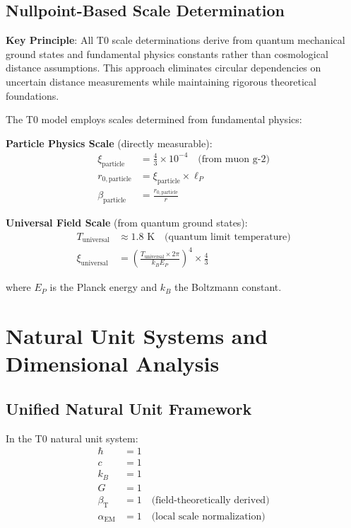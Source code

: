 \documentclass[12pt,a4paper]{article}
\newcommand{\betaT}{\beta_{\text{T}}}
\newcommand{\alphaEM}{\alpha_{\text{EM}}}
\begin{document}
	\subsection{Nullpoint-Based Scale Determination}
	\label{subsec:nullpoint_methodology}
	
	\begin{tcolorbox}[colback=orange!5!white,colframe=orange!75!black,title=Nullpoint-Based Universal Methodology]
		\textbf{Key Principle}: All T0 scale determinations derive from quantum mechanical ground states and fundamental physics constants rather than cosmological distance assumptions. This approach eliminates circular dependencies on uncertain distance measurements while maintaining rigorous theoretical foundations.
	\end{tcolorbox}
	
	The T0 model employs scales determined from fundamental physics:
	
	\textbf{Particle Physics Scale} (directly measurable):
	\begin{align}
		\xi_{\text{particle}} &= \frac{4}{3} \times 10^{-4} \quad \text{(from muon g-2)} \\
		r_{0,\text{particle}} &= \xi_{\text{particle}} \times \ell_P \\
		\beta_{\text{particle}} &= \frac{r_{0,\text{particle}}}{r}
	\end{align}
	
	\textbf{Universal Field Scale} (from quantum ground states):
	\begin{align}
		T_{\text{universal}} &\approx 1.8 \text{ K} \quad \text{(quantum limit temperature)} \\
		\xi_{\text{universal}} &= \left(\frac{T_{\text{universal}} \times 2\pi}{k_B E_P}\right)^4 \times \frac{4}{3}
	\end{align}
	
	where $E_P$ is the Planck energy and $k_B$ the Boltzmann constant.
	
	\section{Natural Unit Systems and Dimensional Analysis}
	\label{sec:natural_units}
	
	\subsection{Unified Natural Unit Framework}
	\label{subsec:unified_framework}
	
	In the T0 natural unit system:
	\begin{align}
		\hbar &= 1 \\
		c &= 1 \\
		k_B &= 1 \\
		G &= 1 \\
		\betaT &= 1 \quad \text{(field-theoretically derived)} \\
		\alphaEM &= 1 \quad \text{(local scale normalization)}
	\end{align}
	
\end{document}

